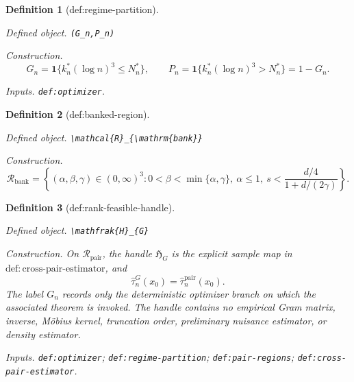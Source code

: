 \documentclass{article}
\newtheorem{definition}{Definition}
\begin{document}
\begin{definition}[def:regime-partition]\label{def:regime-partition}
\par\smallskip\noindent\emph{Defined object.} \texttt{(G\_\allowbreak{}n,\allowbreak{}P\_\allowbreak{}n)}
\par\smallskip\noindent\emph{Construction.} \[G_n=\mathbf{1}\{k_n^*(\log n)^3\leq N_n^*\},\qquad P_n=\mathbf{1}\{k_n^*(\log n)^3>N_n^*\}=1-G_n.\]
\par\smallskip\noindent\emph{Inputs.} \texttt{def:\allowbreak{}optimizer}.
\end{definition}

\begin{definition}[def:banked-region]\label{def:banked-region}
\par\smallskip\noindent\emph{Defined object.} \texttt{\textbackslash{}\allowbreak{}mathcal\{R\}\allowbreak{}\_\allowbreak{}\{\textbackslash{}\allowbreak{}mathrm\{bank\}\allowbreak{}\}\allowbreak{}}
\par\smallskip\noindent\emph{Construction.} \[\mathcal{R}_{\mathrm{bank}}=\left\{(\alpha,\beta,\gamma)\in(0,\infty)^3:0<\beta<\min\{\alpha,\gamma\},\ \alpha\leq1,\ s<\frac{d/4}{1+d/(2\gamma)}\right\}.\]
\end{definition}

\begin{definition}[def:rank-feasible-handle]\label{def:rank-feasible-handle}
\par\smallskip\noindent\emph{Defined object.} \texttt{\textbackslash{}\allowbreak{}mathfrak\{H\}\allowbreak{}\_\allowbreak{}\{G\}\allowbreak{}}
\par\smallskip\noindent\emph{Construction.} On \(\mathcal R_{\mathrm{pair}}\), the handle \(\mathfrak H_G\) is the explicit sample map in \(\mathrm{def:cross\mbox{-}pair\mbox{-}estimator}\), and
\[
 \widehat\tau_n^G(x_0)=\widehat\tau_n^{\mathrm{pair}}(x_0).
\]
The label \(G_n\) records only the deterministic optimizer branch on which the associated theorem is invoked.  The handle contains no empirical Gram matrix, inverse, M\"obius kernel, truncation order, preliminary nuisance estimator, or density estimator.
\par\smallskip\noindent\emph{Inputs.} \texttt{def:\allowbreak{}optimizer}; \texttt{def:\allowbreak{}regime-\allowbreak{}partition}; \texttt{def:\allowbreak{}pair-\allowbreak{}regions}; \texttt{def:\allowbreak{}cross-\allowbreak{}pair-\allowbreak{}estimator}.
\end{definition}
\end{document}
